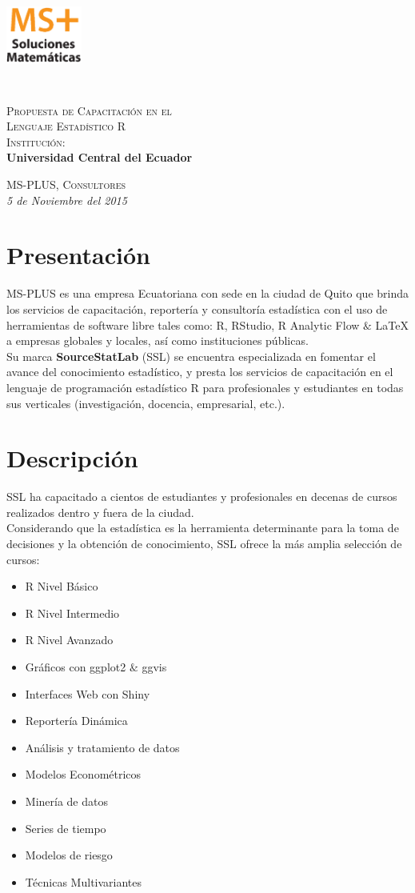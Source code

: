 \documentclass[11pt,a4paper,oneside]{article}\usepackage[]{graphicx}\usepackage[]{color}
\newcommand*{\titleBOOK}{\begingroup
\begin{minipage}[d]{160mm}
\includegraphics[height=2.5cm, width=2.5cm]{figuras/msplus.eps}
\end{minipage}\\[2cm]
\centering
\vspace*{\baselineskip}
{\Huge\scshape Propuesta de Capacitación en el\\[3mm]
Lenguaje Estadístico R} \\[4cm]
{\scshape Institución:}\\[5mm]
{\Large\bfseries Universidad Central del Ecuador}\\[0.3 \textheight]
\vfill
\begin{flushright}
{\scshape MS-PLUS, Consultores}\\
{\itshape 5 de Noviembre del 2015}
\end{flushright}
\vspace*{\baselineskip}
\endgroup}
\begin{document}
\titleBOOK

\tableofcontents
\newpage

\section{Presentación}

MS-PLUS es una empresa Ecuatoriana con sede en la ciudad de Quito que brinda los servicios de capacitación, reportería y consultoría estadística con el uso de herramientas de software libre tales como: R, RStudio, R Analytic Flow $\&$ LaTeX a empresas globales y locales, así como instituciones públicas.\\

Su marca {\bf SourceStatLab} (SSL) se encuentra especializada en fomentar el avance del conocimiento estadístico, y presta los servicios de capacitación en el lenguaje de programación estadístico R para profesionales y estudiantes en todas sus verticales (investigación, docencia, empresarial, etc.).

\section{Descripción}

SSL ha capacitado a cientos de estudiantes y profesionales en decenas de cursos realizados dentro y fuera de la ciudad.\\

Considerando que la estadística es la herramienta determinante para la toma de decisiones y la obtención de conocimiento, SSL ofrece la más amplia selección de cursos:

\begin{multicols}{2}
\begin{itemize}
   \item R Nivel Básico
   \item R Nivel Intermedio
   \item R Nivel Avanzado
   \item Gráficos con ggplot2 $\&$ ggvis
   \item Interfaces Web con Shiny
   \item Reportería Dinámica
   \item Análisis y tratamiento de datos
   \item Modelos Econométricos
   \item Minería de datos 
   \item Series de tiempo
   \item Modelos de riesgo
   \item Técnicas Multivariantes
\end{itemize}
\end{multicols}
\end{document}
